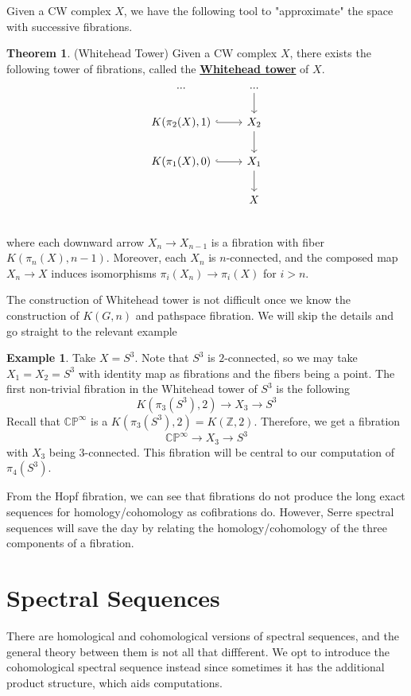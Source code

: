 \documentclass{article}
\theoremstyle{definition}
\newtheorem{theorem}{Theorem}[section]
\theoremstyle{definition}
\theoremstyle{definition}
\theoremstyle{definition}
\theoremstyle{definition}
\theoremstyle{definition}
\newtheorem{example}{Example}[theorem]
\begin{document}
Given a CW complex $X$, we have the following tool to "approximate" the space with successive fibrations. 
\begin{tcolorbox}[colback=red!5!white,colframe=red!30!white]
\begin{theorem}
(Whitehead Tower) Given a CW complex $X$, there exists the following tower of fibrations, called the \underline{\textbf{Whitehead tower}} of $X$.
\[ \begin{tikzcd}
...& ...\arrow[d]\\
K(\pi_2(X),1)\arrow[r,hookrightarrow]& X_2\arrow[d]\\
K(\pi_1(X),0)\arrow[r,hookrightarrow]& X_1\arrow[d]\\
& X\\
\end{tikzcd} \]
where each downward arrow $X_n\to X_{n-1}$ is a fibration with fiber $K(\pi_n(X),n-1)$. Moreover, each $X_n$ is $n$-connected, and the composed map $X_n\to X$ induces isomorphisms $\pi_i(X_n)\to \pi_i(X)$ for $i>n$.
\end{theorem}
\end{tcolorbox}
The construction of Whitehead tower is not difficult once we know the  construction of $K(G,n)$ and pathspace fibration. We will skip the details and go straight to the relevant example


 \begin{tcolorbox}[colback=yellow!5!white,colframe=yellow!30!white]
 \begin{example}
 Take $X=S^3$. Note that $S^3$ is $2$-connected, so we may take $X_1=X_2=S^3$ with identity map as fibrations and the fibers being a point. The first non-trivial fibration in the Whitehead tower of $S^3$ is the following 
 \[K(\pi_3(S^3),2)\to X_3\to S^3\]
 Recall that $\mathbb{CP}^{\infty}$ is a $K(\pi_3(S^3),2)=K(\mathbb{Z},2)$. Therefore, we get a fibration 
 \[\mathbb{CP} ^{\infty}\to X_3\to S^3\] 
 with $X_3$ being $3$-connected. This fibration will be central to our computation of $\pi_4(S^3)$. 
 \end{example}
 \end{tcolorbox}

From the Hopf fibration, we can see that fibrations do not produce the long exact sequences for homology/cohomology as cofibrations do. However, Serre spectral sequences will save the day by relating the homology/cohomology of the three components of a fibration. 
\section{Spectral Sequences}
There are homological and cohomological versions of spectral sequences, and the general theory between them is not all that diffferent. We opt to introduce the cohomological spectral sequence instead since sometimes it has the additional product structure, which aids computations.
\end{document}
